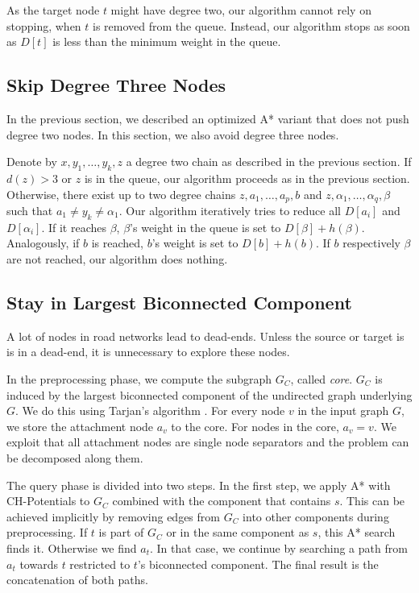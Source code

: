 \documentclass[a4paper,USenglish,cleveref, autoref, thm-restate]{lipics-v2019}
\begin{document}
As the target node $t$ might have degree two, our algorithm cannot rely on stopping, when $t$ is removed from the queue.
Instead, our algorithm stops as soon as $D[t]$ is less than the minimum weight in the queue.

\subsection{Skip Degree Three Nodes}

In the previous section, we described an optimized A* variant that does not push degree two nodes.
In this section, we also avoid degree three nodes.

Denote by $x,y_1,\ldots, y_k, z$ a degree two chain as described in the previous section.
If $d(z) > 3$ or $z$ is in the queue, our algorithm proceeds as in the previous section.
Otherwise, there exist up to two degree chains $z,a_1,\ldots,a_p,b$ and $z,\alpha_1,\ldots,\alpha_q,\beta$ such that $a_1\neq y_k \neq \alpha_1$.
Our algorithm iteratively tries to reduce all $D[a_i]$ and $D[\alpha_i]$.
If it reaches $\beta$, $\beta$'s weight in the queue is set to $D[\beta]+h(\beta)$.
Analogously, if $b$ is reached, $b$'s weight is set to $D[b]+h(b)$.
If $b$ respectively $\beta$ are not reached, our algorithm does nothing.

\subsection{Stay in Largest Biconnected Component}

\label{sec:largested-biconnected-component}

A lot of nodes in road networks lead to dead-ends.
Unless the source or target is is in a dead-end, it is unnecessary to explore these nodes.

In the preprocessing phase, we compute the subgraph $G_C$, called \emph{core}.
$G_C$ is induced by the largest biconnected component of the undirected graph underlying $G$.
We do this using Tarjan's algorithm \cite{t-dfslg2-72}.
For every node $v$ in the input graph $G$, we store the attachment node $a_v$ to the core.
For nodes in the core, $a_v=v$.
We exploit that all attachment nodes are single node separators and the problem can be decomposed along them.

The query phase is divided into two steps.
In the first step, we apply A* with CH-Potentials to $G_C$ combined with the component that contains $s$.
This can be achieved implicitly by removing edges from $G_C$ into other components during preprocessing.
If $t$ is part of $G_C$ or in the same component as $s$, this A* search finds it.
Otherwise we find $a_t$.
In that case, we continue by searching a path from $a_t$ towards $t$ restricted to $t$'s biconnected component.
The final result is the concatenation of both paths.
\end{document}
